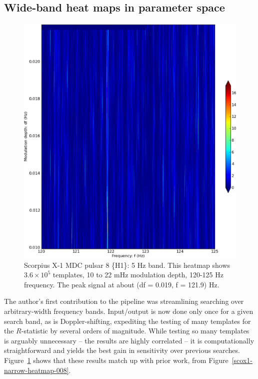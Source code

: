 
\subsection{Wide-band heat maps in parameter space}

\begin{figure}
\begin{center}
\includegraphics[width=0.65\paperwidth,height=0.5\paperheight]{bandH1.eps}
\caption{Scorpius X-1 MDC pulsar 8 \{H1\}: 5 Hz band. This heatmap shows $3.6\times10^{5}$ templates, 10 to 22 mHz modulation depth, 120-125 Hz frequency. The peak signal at about (df = 0.019, f = 121.9) Hz.
}
\label{scox1-wide-heatmap-008}
\end{center}
\end{figure}

The author's first contribution to the pipeline was streamlining searching over arbitrary-width frequency bands.
Input/output is now done only once for a given search band, as is Doppler-shifting, expediting the testing of many templates for the $R$-statistic by several orders of magnitude.
While testing so many templates is arguably unnecessary -- the results are highly correlated -- it is computationally straightforward and yields the best gain in sensitivity over previous searches.
Figure~\ref{scox1-wide-heatmap-008} shows that these results match up with prior work, from Figure~\ref{scox1-narrow-heatmap-008}.

